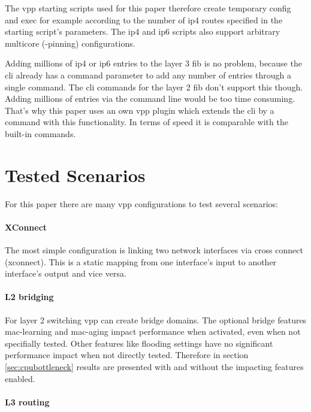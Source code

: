 The \Ac{vpp} starting scripts used for this paper therefore create
temporary \Ac{config} and \Ac{exec} for example according to the
number of \Ac{ip4} routes specified in the starting script's
parameters. The \Ac{ip4} and \Ac{ip6} scripts also support arbitrary
multicore (-pinning) configurations.


Adding millions of \Ac{ip4} or \Ac{ip6} entries to the layer 3
\Ac{fib} is no problem, because the \Ac{cli} already has a command
parameter to add any number of entries through a single command. The
\Ac{cli} commands for the layer 2 \Ac{fib} don't support this though.
Adding millions of entries via the command line would be too time
consuming. That's why this paper uses an own \Ac{vpp} plugin which
extends the \Ac{cli} by a command with this functionality. In terms of
speed it is comparable with the built-in commands.


\section{Tested Scenarios}

For this paper there are many \Ac{vpp} configurations to test several
scenarios:

\paragraph{XConnect} 

The most simple configuration is linking two network interfaces via
cross connect (xconnect). This is a static mapping from one
interface's input to another interface's output and vice versa.

\paragraph{L2 bridging}

For layer 2 switching \Ac{vpp} can create bridge domains. The optional
bridge features mac-learning and mac-aging impact performance when
activated, even when not specifially tested. Other features like
flooding settings have no significant performance impact when not
directly tested. Therefore in section \ref{sec:cpubottleneck} results
are presented with and without the impacting features enabled.

\paragraph{L3 routing}

